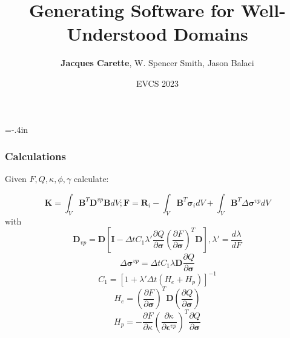 \documentclass[usenames,dvipsnames]{beamer}
\title{Generating Software for Well-Understood Domains}
\author{\textbf{Jacques Carette}, W. Spencer Smith, Jason Balaci}
\institute[McMaster University]
{
  Computing and Software Department\\
  McMaster University
}
\date[EVCS 2023] %
{EVCS 2023}
\begin{document}
\hoffset=-.4in %
\begin{frame}[plain]


\titlepage

\end{frame}
\hoffset=0in %

%  
%  
%  

  
\begin{frame}
  
  \frametitle{Calculations}
  
  Given $F, Q, \kappa, \phi, \gamma$ calculate:

  \begin{equation} \label{EqImplicitFEM}
    \mathbf{K} = \int_V \mathbf{B}^T \mathbf{D}^{vp} \mathbf{B} dV; \mathbf{F} = \mathbf{R}_i - \int_V \mathbf{B}^T \bm{\sigma}_i dV + \int_V \mathbf{B}^T
    \Delta
    \bm{\sigma}^{vp} dV
    \end{equation}
    with
    \begin{equation}
    \mathbf{D}_{vp} =
    \mathbf{D} \left [
    \mathbf{I} - {\Delta t} C_1 \lambda' \frac{\partial Q}{\partial \bm{\sigma}} \left ( \frac{\partial F}{\partial
    \bm{\sigma}} \right )^{T} \mathbf{D}
    \right ], \lambda' = \frac{d \lambda}{d F}
    \end{equation}
    \begin{equation}
    \Delta \bm{\sigma}^{vp} = \Delta t C_1 \lambda \mathbf{D} \frac{\partial Q}{\partial \bm{\sigma}}
    \end{equation}
    \begin{equation}
    C_1 = [1 + \lambda' {\Delta t} (H_e + H_p)]^{-1}
    \end{equation}
    \begin{equation}
    \label{HEE}
    H_e = \left ( \frac{\partial F}{\partial \bm{\sigma}} \right )^T \mathbf{D} (\frac{\partial Q}{\partial \bm{\sigma}})
    \end{equation}
    \begin{equation}
    H_p = -\frac{\partial F}{\partial \kappa} \left ( \frac{\partial \kappa}{\partial \bm{\epsilon}^{vp}}
    \right )^T \frac{\partial Q}{\partial \bm{\sigma}}
    \end{equation}
  
  \end{frame}
  
\end{document}
